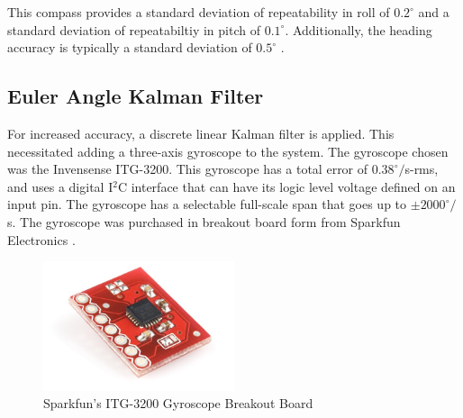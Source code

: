 \documentclass[12pt]{ucthesis}
\begin{document}
This compass provides a standard deviation of repeatability in roll of $0.2^\circ$ and a standard deviation of repeatabiltiy in pitch of $0.1^\circ$. Additionally, the heading accuracy is typically a standard deviation of $0.5^\circ$ \cite{honeywellHMR3500}. 

\subsection*{Euler Angle Kalman Filter}
For increased accuracy, a discrete linear Kalman filter is applied. This necessitated adding a three-axis gyroscope to the system. The gyroscope chosen was the Invensense ITG-3200. This gyroscope has a total error of $0.38^\circ/$s-rms, and uses a digital I$^2$C interface that can have its logic level voltage defined on an input pin. The gyroscope has a selectable full-scale span that goes up to $\pm2000^\circ/$s. The gyroscope was purchased in breakout board form from Sparkfun Electronics \cite{itg3200DataSheet}.

\begin{figure}[H]
  \caption{Sparkfun's ITG-3200 Gyroscope Breakout Board} \label{itg3200Picture}
  \centering
    \includegraphics[width=0.5\textwidth]{figures/itg3200.jpg}
\end{figure}
\end{document}
